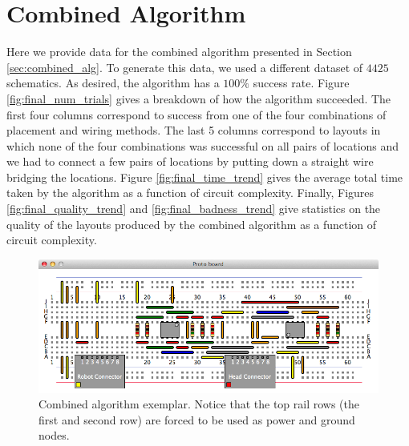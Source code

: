 \section{Combined Algorithm}
\label{sec:combined_algorithm}

Here we provide data for the combined algorithm presented in Section
\ref{sec:combined_alg}. To generate this data, we used a different dataset of
$4425$ schematics. As desired, the algorithm has a $100\%$ success rate.
Figure \ref{fig:final_num_trials} gives a breakdown of how the algorithm
succeeded. The first four columns correspond to success from one of the four
combinations of placement and wiring methods. The last 5 columns correspond to
layouts in which none of the four combinations was successful on all pairs of
locations and we had to connect a few pairs of locations by putting down a
straight wire bridging the locations. Figure
\ref{fig:final_time_trend} gives the average total time taken by the algorithm
as a function of circuit complexity. Finally, Figures
\ref{fig:final_quality_trend} and \ref{fig:final_badness_trend}
give statistics on the quality of the layouts produced by the combined algorithm
as a function of circuit complexity.

\begin{figure}[H]
\begin{center}
\includegraphics[width=\textwidth]{Images/exemplar_combined_algorithm.png}
\caption[Combined algorithm exemplar]{Combined algorithm exemplar. Notice that
the top rail rows (the first and second row) are forced to be used as power and
ground nodes.}
\end{center}
\end{figure}

